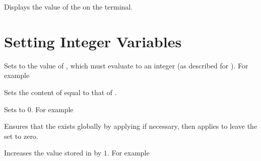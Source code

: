 \documentclass[oneside]{book}
\begin{document}
\begin{function}{\intVarShow}
\begin{syntax}
 
\end{syntax}
Displays the value of the  on the terminal.
\end{function}

\section{Setting Integer Variables}

\begin{function}{\intSet}
\begin{syntax}
  
\end{syntax}
Sets  to the value of ,
which must evaluate to an integer (as described for ).
For example
\begin{demohigh}
\intSet {}
\intUse \lTmpaInt
\end{demohigh}
\end{function}

\begin{function}{\intSetEq}
\begin{syntax}
  
\end{syntax}
Sets the content of  equal to that of
.
\end{function}

\begin{function}{\intZero}
\begin{syntax}
 
\end{syntax}
Sets  to $0$. For example
\begin{demohigh}
\intSet {}
\intZero \lTmpaInt
\intUse \lTmpaInt
\end{demohigh}
\end{function}

\begin{function}{\intZeroNew}
\begin{syntax}
 
\end{syntax}
Ensures that the  exists globally by applying
 if necessary, then applies  to leave
the  set to zero.
\end{function}

\begin{function}{\intIncr}
\begin{syntax}
 
\end{syntax}
Increases the value stored in  by $1$.
For example
\begin{demohigh}
\intSet {}
\intIncr \lTmpaInt
\intUse \lTmpaInt
\end{demohigh}
\end{function}
\end{document}
